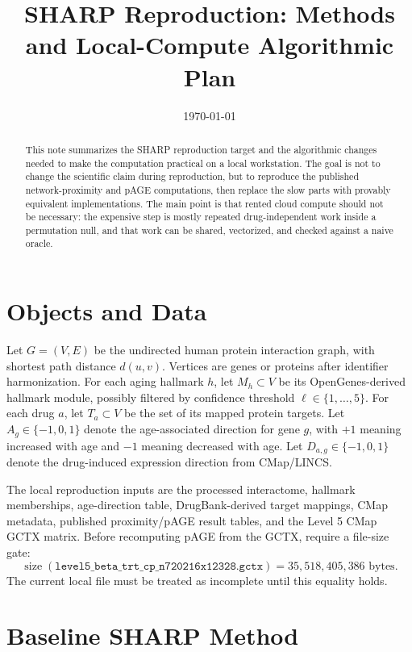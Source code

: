 \documentclass[11pt]{article}
\title{SHARP Reproduction: Methods and Local-Compute Algorithmic Plan}
\author{}
\date{\today}
\begin{document}
\maketitle

\begin{abstract}
This note summarizes the SHARP reproduction target \cite{gross2025sharp} and
the algorithmic changes needed to make the computation practical on a local
workstation. The goal is not to change the scientific claim during
reproduction, but to reproduce the published network-proximity and pAGE
computations, then replace the slow parts with provably equivalent
implementations. The main point is that rented cloud compute should not be
necessary: the expensive step is mostly repeated drug-independent work inside a
permutation null, and that work can be shared, vectorized, and checked against a
naive oracle.
\end{abstract}

\section{Objects and Data}

Let \(G=(V,E)\) be the undirected human protein interaction graph, with shortest
path distance \(d(u,v)\). Vertices are genes or proteins after identifier
harmonization. For each aging hallmark \(h\), let \(M_h \subset V\) be its
OpenGenes-derived hallmark module, possibly filtered by confidence threshold
\(\ell \in \{1,\ldots,5\}\). For each drug \(a\), let \(T_a \subset V\) be the
set of its mapped protein targets. Let \(A_g \in \{-1,0,1\}\) denote the
age-associated direction for gene \(g\), with \(+1\) meaning increased with age
and \(-1\) meaning decreased with age. Let \(D_{a,g} \in \{-1,0,1\}\) denote
the drug-induced expression direction from CMap/LINCS.

The local reproduction inputs are the processed interactome, hallmark
memberships, age-direction table, DrugBank-derived target mappings, CMap
metadata, published proximity/pAGE result tables, and the Level 5 CMap GCTX
matrix. Before recomputing pAGE from the GCTX, require a file-size gate:
\[
  \operatorname{size}(\texttt{level5\_beta\_trt\_cp\_n720216x12328.gctx})
  = 35{,}518{,}405{,}386 \text{ bytes}.
\]
The current local file must be treated as incomplete until this equality holds.

\section{Baseline SHARP Method}
\end{document}
